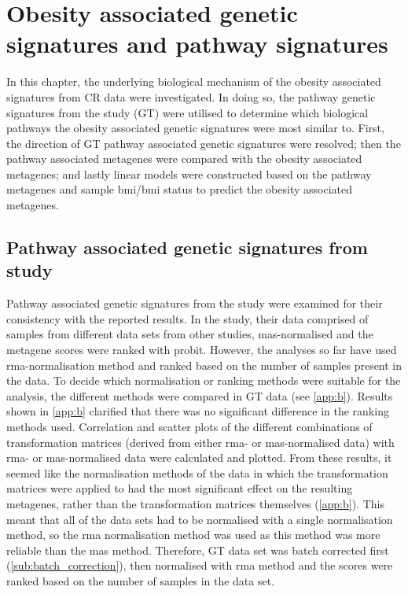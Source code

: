 \chapter{Obesity associated genetic signatures and pathway signatures}
\label{cha:obesity_associated_genetic_signature_and_pathway_signatures}

In this chapter, the underlying biological mechanism of the obesity associated signatures from CR data were investigated.
In doing so, the pathway genetic signatures from the \citet{Gatza2010a} study (GT) were utilised to determine which biological pathways the obesity associated genetic signatures were most similar to.
First, the direction of GT pathway associated genetic signatures were resolved; then the pathway associated metagenes were compared with the obesity associated metagenes; and lastly linear models were constructed based on the pathway metagenes and sample \gls{bmi}/\gls{bmi} status to predict the obesity associated metagenes.

\section{Pathway associated genetic signatures from \citet{Gatza2010a} study}
\label{sec:pathway_associated_genetic_signatures_from_gatza2010a_study}

Pathway associated genetic signatures from the \citet{Gatza2010a} study were examined for their consistency with the reported results.
In the \citet{Gatza2010a} study, their data comprised of samples from different data sets from other studies, \gls{mas}-normalised and the metagene scores were ranked with probit.
However, the analyses so far have used \gls{rma}-normalisation method and ranked based on the number of samples present in the data.
To decide which normalisation or ranking methods were suitable for the analysis, the different methods were compared in GT data (see \cref{app:b}).
Results shown in \cref{app:b} clarified that there was no significant difference in the ranking methods used.
Correlation and scatter plots of the different combinations of transformation matrices (derived from either \gls{rma}- or \gls{mas}-normalised data) with \gls{rma}- or \gls{mas}-normalised data were calculated and plotted.
From these results, it seemed like the normalisation methods of the data in which the transformation matrices were applied to had the most significant effect on the resulting metagenes, rather than the transformation matrices themselves (\cref{app:b}).
This meant that all of the data sets had to be normalised with a single normalisation method, so the \gls{rma} normalisation method was used as this method was more reliable than the \gls{mas} method.
Therefore, GT data set was batch corrected first (\cref{sub:batch_correction}), then normalised with \gls{rma} method and the scores were ranked based on the number of samples in the data set.

